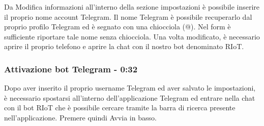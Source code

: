 		Da Modifica informazioni all'interno della sezione impostazioni è possibile inserire il proprio nome account Telegram. Il nome Telegram è possibile recuperarlo dal proprio profilo Telegram ed è segnato con una chiocciola (@). Nel form è sufficiente riportare tale nome senza chiocciola.
		Una volta modificato, è necessario aprire il proprio telefono e aprire la chat con il nostro bot denominato RIoT.

	\subsubsection{Attivazione bot Telegram - 0:32}
		Dopo aver inserito il proprio username Telegram ed aver salvato le impostazioni, è necessario spostarsi all'interno dell'applicazione Telegram ed entrare nella chat con il bot RIoT che è possibile cercare tramite la barra di ricerca presente nell'applicazione.
		Premere quindi Avvia in basso.

